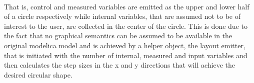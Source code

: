 \\\newline That is, control and measured variables are emitted as the upper and lower half of a circle respectively while internal variables, that are assumed not to be of interest to the user, are collected in the center of the circle. This is done due to the fact that no graphical semantics can be assumed to be available in the original modelica model and is achieved by a helper object, the layout emitter, that is initiated with the number of internal, measured and input variables and then calculates the step sizes in the x and y directions that will achieve the desired circular shape. 



